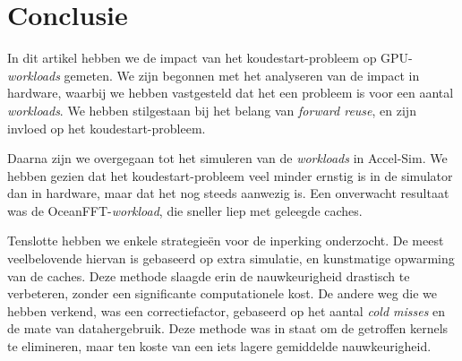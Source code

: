 \documentclass[5p,numvwe]{elsarticle}
\begin{document}
    \section{Conclusie}\label{sec:concl}
    In dit artikel hebben we de impact van het koudestart-probleem op GPU-\textit{workloads} gemeten.
    We zijn begonnen met het analyseren van de impact in hardware, waarbij we hebben vastgesteld dat het een probleem is voor een aantal \textit{workloads}.
    We hebben stilgestaan bij het belang van \textit{forward reuse}, en zijn invloed op het koudestart-probleem.

    Daarna zijn we overgegaan tot het simuleren van de \textit{workloads} in Accel-Sim.
    We hebben gezien dat het koudestart-probleem veel minder ernstig is in de simulator dan in hardware, maar dat het nog steeds aanwezig is.
    Een onverwacht resultaat was de OceanFFT-\textit{workload}, die sneller liep met geleegde caches.

    Tenslotte hebben we enkele strategieën voor de inperking onderzocht.
    De meest veelbelovende hiervan is gebaseerd op extra simulatie, en kunstmatige opwarming van de caches.
    Deze methode slaagde erin de nauwkeurigheid drastisch te verbeteren, zonder een significante computationele kost.
    De andere weg die we hebben verkend, was een correctiefactor, gebaseerd op het aantal \textit{cold misses} en de mate van datahergebruik.
    Deze methode was in staat om de getroffen kernels te elimineren, maar ten koste van een iets lagere gemiddelde nauwkeurigheid.

    
    
\end{document}
